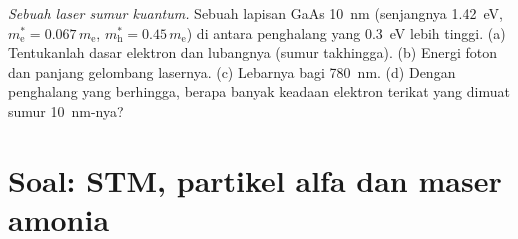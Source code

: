 \begin{exercise}[$\star\star\star$]\label{exo:b2:potential-wells-tunneling:12}
\emph{Sebuah laser sumur kuantum.} Sebuah lapisan GaAs \qty{10}{nm} (senjangnya
\qty{1.42}{eV}, $m_{\text{e}}^* = 0.067\,m_{\text{e}}$, $m_{\text{h}}^* = 0.45\,m_{\text{e}}$)
di antara penghalang yang \qty{0.3}{eV} lebih tinggi. (a) Tentukanlah  dasar
elektron dan lubangnya (sumur takhingga). (b) Energi foton dan panjang gelombang
lasernya. (c) Lebarnya bagi \qty{780}{nm}. (d) Dengan penghalang yang berhingga,
berapa banyak keadaan elektron terikat yang dimuat sumur \qty{10}{nm}-nya?
\end{exercise}

\section{Soal: STM, partikel alfa dan maser amonia}

